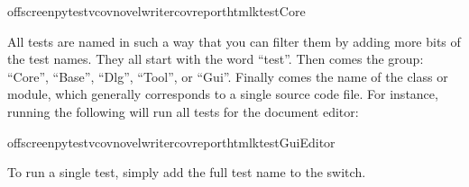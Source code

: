 \documentclass[a4paper,11pt,english]{sphinxmanual}
\begin{document}
\begin{sphinxVerbatim}[commandchars=\\\{\}]
offscreenpytest\PYGZhy{}v\PYGZhy{}\PYGZhy{}covnovelwriter\PYGZhy{}\PYGZhy{}cov\PYGZhy{}reporthtml\PYGZhy{}ktestCore
\end{sphinxVerbatim}

\sphinxAtStartPar
All tests are named in such a way that you can filter them by adding more bits of the test names.
They all start with the word “test”. Then comes the group: “Core”, “Base”, “Dlg”, “Tool”, or “Gui”.
Finally comes the name of the class or module, which generally corresponds to a single source code
file. For instance, running the following will run all tests for the document editor:

\begin{sphinxVerbatim}[commandchars=\\\{\}]
offscreenpytest\PYGZhy{}v\PYGZhy{}\PYGZhy{}covnovelwriter\PYGZhy{}\PYGZhy{}cov\PYGZhy{}reporthtml\PYGZhy{}ktestGuiEditor
\end{sphinxVerbatim}

\sphinxAtStartPar
To run a single test, simply add the full test name to the  switch.



\renewcommand{\indexname}{Index}
\printindex
\end{document}
